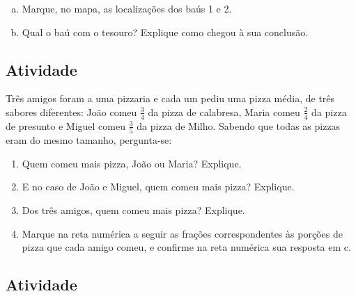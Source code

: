 \begin{enumerate}[a)]
 \item Marque, no mapa, as localizações dos baús 1 e 2.
 \item Qual o baú com o tesouro? Explique como chegou à sua conclusão. 
\end{enumerate}

\subsection{Atividade}

Três amigos foram a uma pizzaria e cada um pediu uma pizza média, de três sabores diferentes: João comeu $\frac{3}{4}$ da pizza de calabresa, Maria comeu  $\frac{2}{4}$ da pizza de presunto e Miguel comeu $\frac{3}{5}$ da pizza de Milho. Sabendo que todas as pizzas eram do mesmo tamanho, pergunta-se:
\begin{enumerate} [\quad a)] %
  \item     Quem comeu mais pizza, João ou Maria? Explique.
  \item     E no caso de João e Miguel, quem comeu mais pizza? Explique.
  \item     Dos três amigos, quem comeu mais pizza? Explique.
  \item     Marque na reta numérica a seguir as frações correspondentes às porções de pizza que cada amigo comeu, e confirme na reta numérica sua resposta em c.
\end{enumerate} %

\begin{center}
\end{center}


\subsection{Atividade}


